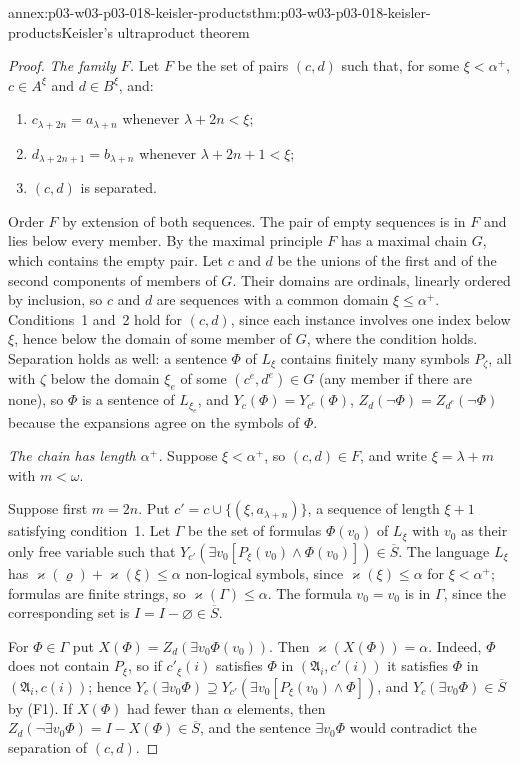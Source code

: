 \begin{annexitem}{annex:p03-w03-p03-018-keisler-products}{thm:p03-w03-p03-018-keisler-products}{Keisler's ultraproduct theorem}
\begin{proof}
\emph{The family \(F\).}  Let \(F\) be the set of pairs \((c,d)\) such that,
for some \(\xi<\alpha^+\), \(c\in A^\xi\) and \(d\in B^\xi\), and:
\begin{enumerate}
  \item \(c_{\lambda+2n}=a_{\lambda+n}\) whenever \(\lambda+2n<\xi\);
  \item \(d_{\lambda+2n+1}=b_{\lambda+n}\) whenever \(\lambda+2n+1<\xi\);
  \item \((c,d)\) is separated.
\end{enumerate}
Order \(F\) by extension of both sequences.  The pair of empty sequences is
in \(F\) and lies below every member.  By the maximal principle \(F\) has a
maximal chain \(G\), which contains the empty pair.  Let \(c\) and \(d\) be
the unions of the first and of the second components of members of \(G\).
Their domains are ordinals, linearly ordered by inclusion, so \(c\) and \(d\)
are sequences with a common domain \(\xi\le\alpha^+\).  Conditions~1 and~2
hold for \((c,d)\), since each instance involves one index below \(\xi\),
hence below the domain of some member of \(G\), where the condition holds.
Separation holds as well: a sentence \(\Phi\) of \(L_\xi\) contains finitely
many symbols \(P_\zeta\), all with \(\zeta\) below the domain \(\xi_e\) of
some \((c^e,d^e)\in G\) (any member if there are none), so \(\Phi\) is a
sentence of \(L_{\xi_e}\), and \(Y_c(\Phi)=Y_{c^e}(\Phi)\),
\(Z_d(\neg\Phi)=Z_{d^e}(\neg\Phi)\) because the expansions agree on the
symbols of \(\Phi\).

\emph{The chain has length \(\alpha^+\).}  Suppose \(\xi<\alpha^+\), so
\((c,d)\in F\), and write \(\xi=\lambda+m\) with \(m<\omega\).

Suppose first \(m=2n\).  Put \(c'=c\cup\{(\xi,a_{\lambda+n})\}\), a
sequence of length \(\xi+1\) satisfying condition~1.  Let \(\Gamma\) be the
set of formulas \(\Phi(v_0)\) of \(L_\xi\) with \(v_0\) as their only free
variable such that
\(Y_{c'}(\exists v_0[P_\xi(v_0)\wedge\Phi(v_0)])\in\overline S\).  The
language \(L_\xi\) has \(\varkappa(\varrho)+\varkappa(\xi)\le\alpha\)
non-logical symbols, since \(\varkappa(\xi)\le\alpha\) for \(\xi<\alpha^+\);
formulas are finite strings, so \(\varkappa(\Gamma)\le\alpha\).  The formula
\(v_0=v_0\) is in \(\Gamma\), since the corresponding set is
\(I=I-\varnothing\in\overline S\).

For \(\Phi\in\Gamma\) put \(X(\Phi)=Z_d(\exists v_0\Phi(v_0))\).  Then
\(\varkappa(X(\Phi))=\alpha\).  Indeed, \(\Phi\) does not contain
\(P_\xi\), so if \(c'_\xi(i)\) satisfies \(\Phi\) in
\((\mathfrak A_i,c'(i))\) it satisfies \(\Phi\) in \((\mathfrak A_i,c(i))\);
hence \(Y_c(\exists v_0\Phi)\supseteq
Y_{c'}(\exists v_0[P_\xi(v_0)\wedge\Phi])\), and
\(Y_c(\exists v_0\Phi)\in\overline S\) by (F1).  If \(X(\Phi)\) had fewer than
\(\alpha\) elements, then \(Z_d(\neg\exists v_0\Phi)=I-X(\Phi)\in\overline
S\), and the sentence \(\exists v_0\Phi\) would contradict the separation of
\((c,d)\).


\end{proof}
\end{annexitem}
